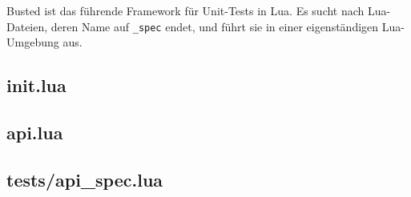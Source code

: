 Busted ist das führende Framework für Unit-Tests in Lua. Es sucht nach
Lua-Dateien, deren Name auf \texttt{\_\allowbreak{}spec} endet, und
führt sie in einer eigenständigen Lua-Umgebung aus.

\begin{Shaded}
\begin{Highlighting}[]
\end{Highlighting}
\end{Shaded}

\subsection{init.lua}\label{init.lua}

\begin{Shaded}
\begin{Highlighting}[]
 \OperatorTok{=} \OperatorTok{\{\}}

\OperatorTok{(}\OperatorTok{(}\OperatorTok{)}  \OperatorTok{)}
\end{Highlighting}
\end{Shaded}

\subsection{api.lua}\label{api.lua}

\begin{Shaded}
\begin{Highlighting}[]
 \OperatorTok{(}\OperatorTok{,} \OperatorTok{)}
      \OperatorTok{+} 
\end{Highlighting}
\end{Shaded}

\subsection{tests/api\_spec.lua}\label{testsapi_spec.lua}

